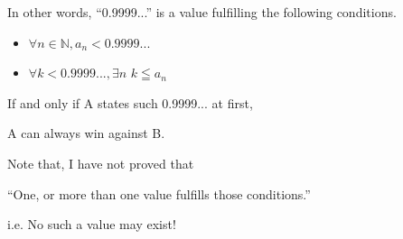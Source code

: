 \begin{frame}[c]{}{}
  In other words, ``0.9999...'' is a value fulfilling the following conditions.

  \vspace{2ex}

  \begin{itemize}
  \item $\forall n \in \mathbb{N}, a_n < 0.9999...$
  \item $\forall k < 0.9999..., \exists n$ $k \leqq a_n$
  \end{itemize}

  \vspace{2ex}

  If and only if A states such 0.9999... at first,

  A can always win against B.
\end{frame}

\begin{frame}[c]{}{}
  Note that, I have not proved that

  ``One, or more than one value fulfills those conditions.''

  \vspace{2ex}

  i.e. No such a value may exist!
\end{frame}
